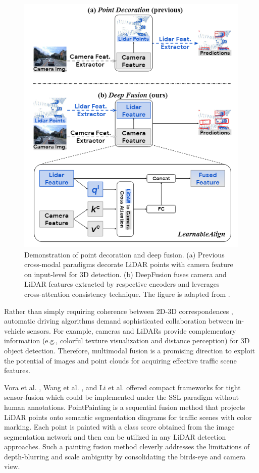 \documentclass[a4paper,fleqn]{cas-dc}
\begin{document}
\begin{figure}[htbp]
    \centering
    \includegraphics[width=0.97\linewidth]{deepfusion.png}
    \caption{Demonstration of point decoration and deep fusion. (a) Previous cross-modal paradigms \citep{lal2021coconets,jing2021self} decorate LiDAR points with camera feature on input-level for 3D detection. (b) DeepFusion \citep{li2022deepfusion} fuses camera and LiDAR features extracted by respective encoders and leverages cross-attention consistency technique. The figure is adapted from \citep{li2022deepfusion}.}  
    \label{fig:deepfusion}
\end{figure}


Rather than simply requiring coherence between 2D-3D correspondences \citep{lal2021coconets,jing2021self,tran2022self}, automatic driving algorithms demand sophisticated collaboration between in-vehicle sensors. For example, cameras and LiDARs provide complementary information (e.g., colorful texture visualization and distance perception) for 3D object detection. Therefore, multimodal fusion is a promising direction to exploit the potential of images and point clouds for acquiring effective traffic scene features.

Vora et al. \citep{vora2020pointpainting}, Wang et al. \citep{wang2021pointaugmenting}, and Li et al. \citep{li2022deepfusion} offered compact frameworks for tight sensor-fusion which could be implemented under the SSL paradigm without human annotations. PointPainting \citep{vora2020pointpainting} is a sequential fusion method that projects LiDAR points onto semantic segmentation diagrams for traffic scenes with color marking. Each point is painted with a class score obtained from the image segmentation network and then can be utilized in any LiDAR detection approaches. Such a painting fusion method cleverly addresses the limitations of depth-blurring and scale ambiguity by consolidating the birds-eye and camera view. 
\end{document}
